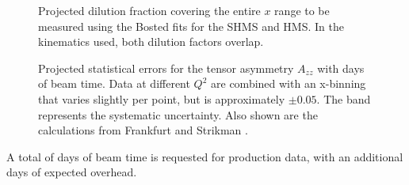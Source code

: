 \begin{figure}
\begin{center}
\caption{\label{fdil_plot}Projected dilution fraction covering the entire $x$ range to be measured using the Bosted fits \cite{Bosted:2012qc} for the SHMS and HMS. In the kinematics used, both dilution factors overlap.}
\end{center}
\end{figure}

\begin{figure}
\begin{center}
\caption{\label{PROJ}Projected statistical errors for the tensor asymmetry $A_{zz}$ with \productiondays days of beam time. Data at different $Q^2$ are combined with an x-binning that varies slightly per point, but is approximately $\pm0.05$. The band represents the systematic uncertainty. Also shown are the calculations from Frankfurt and Strikman \cite{Frankfurt:1988nt}.
}
\end{center}
\end{figure}

A total of 
\productiondays
 days of beam time is requested for production data, with an additional \overheaddays days of expected overhead.



\clearpage

%





